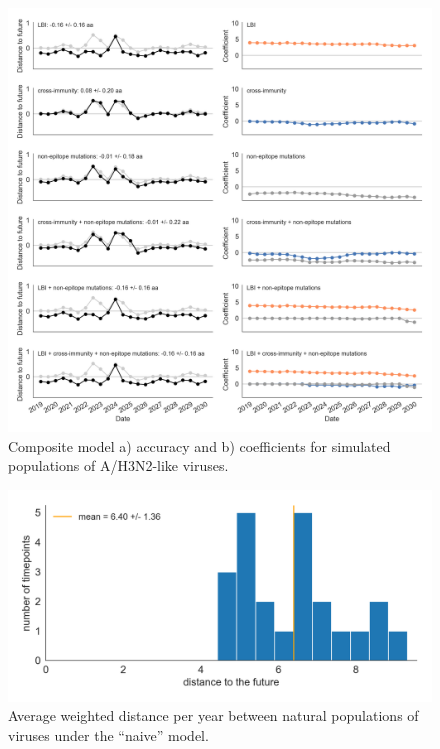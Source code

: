 \begin{figure}[t]
  \begin{center}
  \includegraphics[width=\textwidth]{figures/unadjusted-composite-model-accuracy-and-coefficients-for-simulated-populations.png}
  \caption{Composite model a) accuracy and b) coefficients for simulated populations of A/H3N2-like viruses.}
  \label{sup_fig:unadjusted_composite_model_accuracy_and_coefficients_for_simulated_populations}
  \end{center}
\end{figure}

\begin{figure}[t]
  \begin{center}
  \includegraphics[width=\textwidth]{figures/distance-of-natural-populations-between-timepoints.png}
  \caption{Average weighted distance per year between natural populations of viruses under the ``naive'' model.}
  \label{sup_fig:distance_of_natural_populations_between_timepoints}
  \end{center}
\end{figure}

